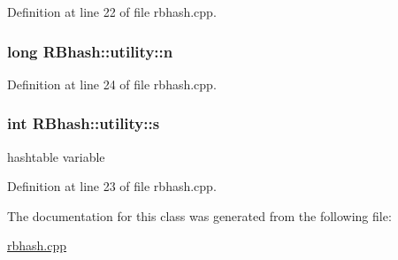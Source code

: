 Definition at line 22 of file rbhash.\-cpp.

\hypertarget{class_r_bhash_1_1utility_aa3e63fea701cf99046aeab691ba4da41}{
\subsubsection[{n}]{\setlength{\rightskip}{0pt plus 5cm}long R\-Bhash\-::utility\-::n}}\label{class_r_bhash_1_1utility_aa3e63fea701cf99046aeab691ba4da41}


Definition at line 24 of file rbhash.\-cpp.

\hypertarget{class_r_bhash_1_1utility_a5674754a0754872a1c2a2931f5495a21}{
\subsubsection[{s}]{\setlength{\rightskip}{0pt plus 5cm}int R\-Bhash\-::utility\-::s}}\label{class_r_bhash_1_1utility_a5674754a0754872a1c2a2931f5495a21}


hashtable variable 



Definition at line 23 of file rbhash.\-cpp.



The documentation for this class was generated from the following file\-:\begin{DoxyCompactItemize}
\item 
\hyperlink{rbhash_8cpp}{rbhash.\-cpp}\end{DoxyCompactItemize}
